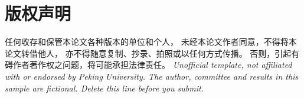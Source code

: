 \chapter*{版权声明}
\thispagestyle{empty}
任何收存和保管本论文各种版本的单位和个人，
未经本论文作者同意，不得将本论文转借他人，
亦不得随意复制、抄录、拍照或以任何方式传播。
否则，引起有碍作者著作权之问题，将可能承担法律责任。
\vfill
{\footnotesize\itshape Unofficial template, not affiliated with or endorsed by Peking University. The author, committee and results in this sample are fictional. Delete this line before you submit.}
